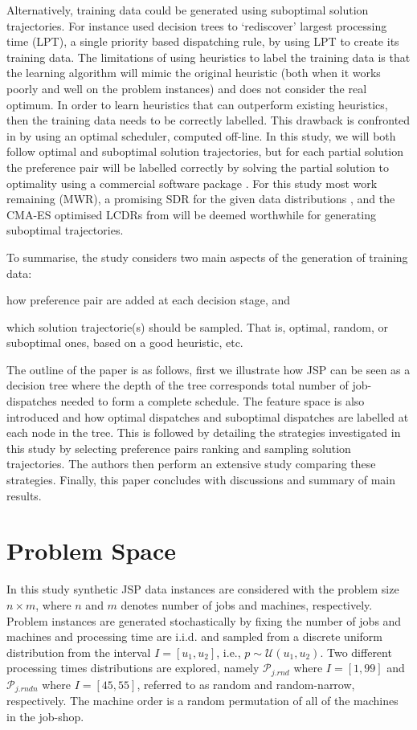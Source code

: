 \documentclass[smallextended]{llncs}
\begin{document}
Alternatively, training data could be generated using suboptimal solution trajectories. For instance \cite{Siggi05} used decision trees to `rediscover' largest processing time (LPT),  a single priority based dispatching rule, by 
using LPT to create its training data. The limitations of using heuristics to label the training data is that the learning algorithm will mimic the original heuristic (both when it works poorly and well on the problem instances) and does not consider the real optimum. In order to learn heuristics that can outperform existing heuristics, then the training data needs to be correctly labelled. This drawback is confronted in \cite{Malik08,Russell09,Siggi10} by using an optimal scheduler, computed off-line. In this study, we will both follow optimal and suboptimal solution trajectories, but for each partial solution the preference pair will be labelled correctly by solving the partial solution to optimality using a commercial software package \cite{gurobi}. 
For this study most work remaining (MWR), a promising SDR for the given data distributions \cite{InRu12}, and the CMA-ES optimised LCDRs from \cite{InRu14a} will be deemed worthwhile for generating suboptimal trajectories.

To summarise, the study considers two main aspects of the generation of training data: 
\begin{inparaenum} 
\item how preference pair are added at each decision stage, and
\item which solution trajectorie(s) should be sampled. That is, optimal, random, or suboptimal ones, based on a good 
heuristic, etc.
\end{inparaenum}

The outline of the paper is as follows, first we illustrate how JSP can be seen as a decision tree where the depth of the tree corresponds 
total number of job-dispatches needed to form a complete schedule. The feature space is also introduced and how  optimal dispatches and suboptimal dispatches are labelled at each node in the tree. This is followed by detailing the strategies investigated in this study by selecting preference pairs ranking and sampling solution trajectories. The authors then perform an extensive study comparing these strategies. Finally, this paper concludes with discussions and summary of main results.

\section{Problem Space}
In this study synthetic JSP  data instances are considered with the problem size $n\times m$, where $n$ and $m$ denotes  number of jobs and machines, respectively. 
Problem instances are generated stochastically by fixing the number of jobs and machines and processing time are i.i.d. and sampled from a discrete uniform distribution from the interval $I=[u_1,u_2]$, i.e., $p\sim \mathcal{U}(u_1,u_2)$.
Two different processing times distributions are explored, namely 
$\mathcal{P}_{j.rnd}$ where $I=[1,99]$ and $\mathcal{P}_{j.rndn}$ where $I=[45,55]$, referred to as random and random-narrow, respectively.
The machine order is a random permutation of all of the machines in the job-shop. 
\end{document}
